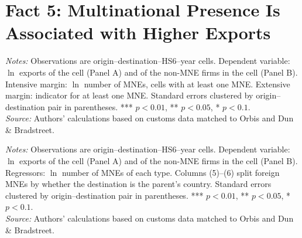 \documentclass[11pt,a4paper]{article}
\begin{document}
\section*{Fact 5: Multinational Presence Is Associated with Higher Exports}%
\begin{table}[H]\centering\small%
  \caption{Multinational Presence and Exports}%
  \label{tab:d_t1}%
  \par\vspace{3pt}%
  \begin{minipage}{0.95\textwidth}\footnotesize %
  \textit{Notes:} Observations are origin--destination--HS6--year cells. Dependent variable: $\ln$ exports of the cell (Panel A) and of the non-MNE firms in the cell (Panel B). Intensive margin: $\ln$ number of MNEs, cells with at least one MNE. Extensive margin: indicator for at least one MNE. Standard errors clustered by origin--destination pair in parentheses. *** $p<0.01$, ** $p<0.05$, * $p<0.1$.\\[3pt]%
  \textit{Source:} Authors' calculations based on customs data matched to Orbis and Dun \& Bradstreet.%
  \end{minipage}%
  \end{table}
\begin{table}[H]\centering\small%
  \caption{Multinational Presence and Exports: Intensive Margin, by Type of Multinational}%
  \label{tab:d_counts}%
  \par\vspace{3pt}%
  \begin{minipage}{0.95\textwidth}\footnotesize %
  \textit{Notes:} Observations are origin--destination--HS6--year cells. Dependent variable: $\ln$ exports of the cell (Panel A) and of the non-MNE firms in the cell (Panel B). Regressors: $\ln$ number of MNEs of each type. Columns (5)--(6) split foreign MNEs by whether the destination is the parent's country. Standard errors clustered by origin--destination pair in parentheses. *** $p<0.01$, ** $p<0.05$, * $p<0.1$.\\[3pt]%
  \textit{Source:} Authors' calculations based on customs data matched to Orbis and Dun \& Bradstreet.%
  \end{minipage}%
  \end{table}
\end{document}
